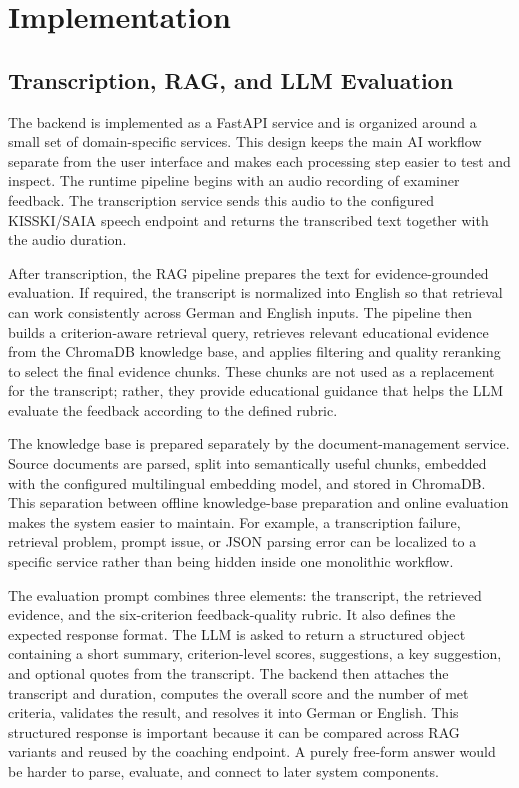 \section{Implementation}

\subsection{Transcription, RAG, and LLM Evaluation}
The backend is implemented as a FastAPI service and is organized around a small
set of domain-specific services. This design keeps the main AI workflow
separate from the user interface and makes each processing step easier to test
and inspect. The runtime pipeline begins with an audio recording of examiner
feedback. The transcription service sends this audio to the configured
KISSKI/SAIA speech endpoint and returns the transcribed text together with the
audio duration.

After transcription, the RAG pipeline prepares the text for evidence-grounded
evaluation. If required, the transcript is normalized into English so that
retrieval can work consistently across German and English inputs. The pipeline
then builds a criterion-aware retrieval query, retrieves relevant educational
evidence from the ChromaDB knowledge base, and applies filtering and quality
reranking to select the final evidence chunks. These chunks are not used as a
replacement for the transcript; rather, they provide educational guidance that
helps the LLM evaluate the feedback according to the defined rubric.

The knowledge base is prepared separately by the document-management service.
Source documents are parsed, split into semantically useful chunks, embedded
with the configured multilingual embedding model, and stored in ChromaDB. This
separation between offline knowledge-base preparation and online evaluation
makes the system easier to maintain. For example, a transcription failure,
retrieval problem, prompt issue, or JSON parsing error can be localized to a
specific service rather than being hidden inside one monolithic workflow.

The evaluation prompt combines three elements: the transcript, the retrieved
evidence, and the six-criterion feedback-quality rubric. It also defines the
expected response format. The LLM is asked to return a structured object
containing a short summary, criterion-level scores, suggestions, a key
suggestion, and optional quotes from the transcript. The backend then attaches
the transcript and duration, computes the overall score and the number of met
criteria, validates the result, and resolves it into German or English. This
structured response is important because it can be compared across RAG variants
and reused by the coaching endpoint. A purely free-form answer would be harder
to parse, evaluate, and connect to later system components.

